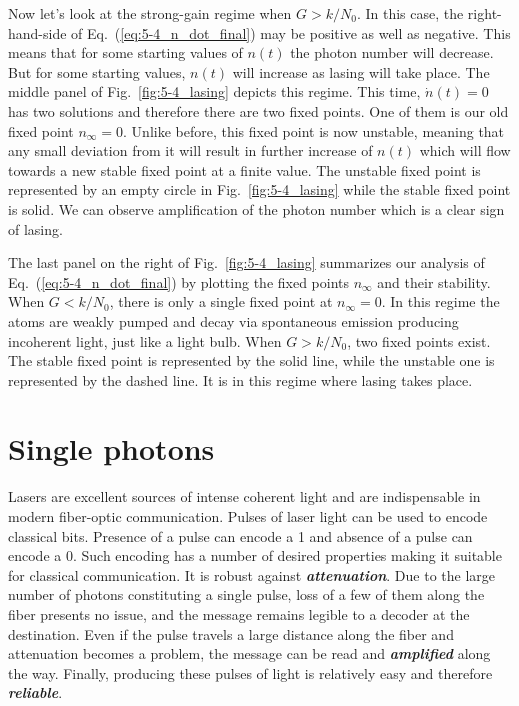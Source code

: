 Now let's look at the strong-gain regime when $G > k / N_0$.
In this case, the right-hand-side of Eq.~(\ref{eq:5-4_n_dot_final}) may be positive as well as negative.
This means that for some starting values of $n(t)$ the photon number will decrease.
But for some starting values, $n(t)$ will increase as lasing will take place.
The middle panel of Fig.~\ref{fig:5-4_lasing} depicts this regime.
This time, $\dot{n}(t) = 0$ has two solutions and therefore there are two fixed points.
One of them is our old fixed point $n_{\infty} = 0$.
Unlike before, this fixed point is now unstable, meaning that any small deviation from it will result in further increase of $n(t)$ which will flow towards a new stable fixed point at a finite value.
The unstable fixed point is represented by an empty circle in Fig.~\ref{fig:5-4_lasing} while the stable fixed point is solid.
We can observe amplification of the photon number which is a clear sign of lasing.

The last panel on the right of Fig.~\ref{fig:5-4_lasing} summarizes our analysis of Eq.~(\ref{eq:5-4_n_dot_final}) by plotting the fixed points $n_{\infty}$ and their stability.
When $G < k / N_0$, there is only a single fixed point at $n_{\infty} = 0$.
In this regime the atoms are weakly pumped and decay via spontaneous emission producing incoherent light, just like a light bulb.
When $G > k / N_0$, two fixed points exist.
The stable fixed point is represented by the solid line, while the unstable one is represented by the dashed line.
It is in this regime where lasing takes place.


\section{Single photons}
\label{sec:5-5_single_photons}

Lasers are excellent sources of intense coherent light and are indispensable in modern fiber-optic communication.
Pulses of laser light can be used to encode classical bits.
Presence of a pulse can encode a 1 and absence of a pulse can encode a 0.
Such encoding has a number of desired properties making it suitable for classical communication.
It is robust against \textit{\textbf{attenuation}}.
Due to the large number of photons constituting a single pulse, loss of a few of them along the fiber presents no issue, and the message remains legible to a decoder at the destination.
Even if the pulse travels a large distance along the fiber and attenuation becomes a problem, the message can be read and \textit{\textbf{amplified}} along the way.
Finally, producing these pulses of light is relatively easy and therefore \textit{\textbf{reliable}}.

